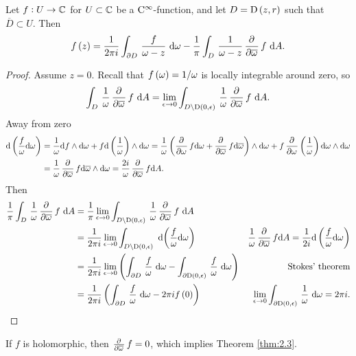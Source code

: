 \begin{proposition}
Let $ f : U \to \mathbb{C} $ for $ U \subset \mathbb{C} $ be a $ \mathrm{C}^\infty $-function, and let $ D = \D\br{z, r} $ such that $ \overline{D} \subset U $. Then
$$ f\br{z} = \dfrac{1}{2\pi i}\intd{\partial D}{}{\dfrac{f}{\omega - z}}{\omega} - \dfrac{1}{\pi}\intd{D}{}{\dfrac{1}{\omega - z}\dpd{}{\overline{\omega}}f}{A}. $$
\end{proposition}

\begin{proof}
Assume $ z = 0 $. Recall that $ f\br{\omega} = 1 / \omega $ is locally integrable around zero, so
$$ \intd{D}{}{\dfrac{1}{\omega}\dpd{}{\overline{\omega}}f}{A} = \lim_{\epsilon \to 0} \intd{D \setminus \D\br{0, \epsilon}}{}{\dfrac{1}{\omega}\dpd{}{\overline{\omega}}f}{A}. $$
Away from zero
\begin{align*}
\d\br{\dfrac{f}{\omega} \d\omega}
& = \dfrac{1}{\omega} \d f \wedge \d\omega + f \d\br{\dfrac{1}{\omega}} \wedge \d\omega
= \dfrac{1}{\omega} \br{\dpd{}{\omega}f \d\omega + \dpd{}{\overline{\omega}}f \d\overline{\omega}} \wedge \d\omega + f\dpd{}{\omega}\br{\dfrac{1}{\omega}} \d\omega \wedge \d\omega \\
& = \dfrac{1}{\omega}\dpd{}{\overline{\omega}}f \d\overline{\omega} \wedge \d\omega
= \dfrac{2i}{\omega}\dpd{}{\overline{\omega}}f \d A.
\end{align*}
Then
\begin{align*}
\dfrac{1}{\pi}\intd{D}{}{\dfrac{1}{\omega}\dpd{}{\overline{\omega}}f}{A}
& = \dfrac{1}{\pi}\lim_{\epsilon \to 0} \intd{D \setminus \D\br{0, \epsilon}}{}{\dfrac{1}{\omega}\dpd{}{\overline{\omega}}f}{A} \\
& = \dfrac{1}{2\pi i}\lim_{\epsilon \to 0} \intd{D \setminus \D\br{0, \epsilon}}{}{}{\br{\dfrac{f}{\omega} \d\omega}} & \dfrac{1}{\omega}\dpd{}{\overline{\omega}}f \d A = \dfrac{1}{2i} \d\br{\dfrac{f}{\omega} \d\omega} \\
& = \dfrac{1}{2\pi i}\lim_{\epsilon \to 0} \br{\intd{\partial D}{}{\dfrac{f}{\omega}}{\omega} - \intd{\partial\D\br{0, \epsilon}}{}{\dfrac{f}{\omega}}{\omega}} & \text{Stokes' theorem} \\
& = \dfrac{1}{2\pi i}\br{\intd{\partial D}{}{\dfrac{f}{\omega}}{\omega} - 2\pi if\br{0}} & \lim_{\epsilon \to 0} \intd{\partial\D\br{0, \epsilon}}{}{\dfrac{1}{\omega}}{\omega} = 2\pi i.
\end{align*}
\end{proof}

If $ f $ is holomorphic, then $ \tpd{}{\overline{\omega}}f = 0 $, which implies Theorem \ref{thm:2.3}.

